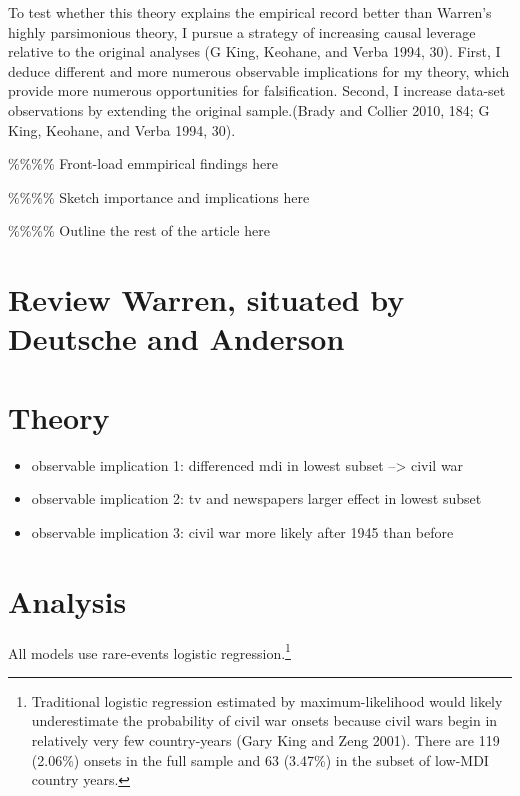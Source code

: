 \documentclass[11pt,article,oneside]{memoir}
\begin{document}
To test whether this theory explains the empirical record better than
Warren's highly parsimonious theory, I pursue a strategy of increasing
causal leverage relative to the original analyses (G King, Keohane, and
Verba 1994, 30). First, I deduce different and more numerous observable
implications for my theory, which provide more numerous opportunities
for falsification. Second, I increase data-set observations by extending
the original sample.(Brady and Collier 2010, 184; G King, Keohane, and
Verba 1994, 30).

\%\%\%\% Front-load emmpirical findings here

\%\%\%\% Sketch importance and implications here

\%\%\%\% Outline the rest of the article here

\section{Review Warren, situated by Deutsche and
Anderson}\label{review-warren-situated-by-deutsche-and-anderson}

\section{Theory}\label{theory}

\begin{itemize}
\itemsep1pt\parskip0pt
\item
  observable implication 1: differenced mdi in lowest subset
  --\textgreater{} civil war
\item
  observable implication 2: tv and newspapers larger effect in lowest
  subset
\item
  observable implication 3: civil war more likely after 1945 than before
\end{itemize}

\section{Analysis}\label{analysis}

All models use rare-events logistic regression.\footnote{Traditional
  logistic regression estimated by maximum-likelihood would likely
  underestimate the probability of civil war onsets because civil wars
  begin in relatively very few country-years (Gary King and Zeng 2001).
  There are 119 (2.06\%) onsets in the full sample and 63 (3.47\%) in
  the subset of low-MDI country years.}
\end{document}
